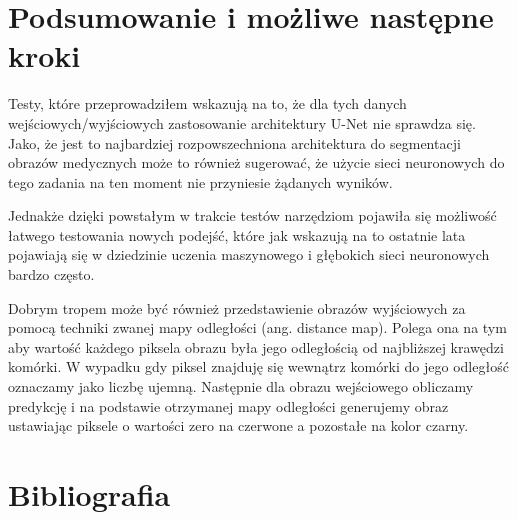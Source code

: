 \documentclass{article}
\begin{document}
\section{Podsumowanie i możliwe następne kroki}
Testy, które przeprowadziłem wskazują na to, że dla tych danych wejściowych/wyjściowych zastosowanie architektury U-Net nie sprawdza się.
Jako, że jest to najbardziej rozpowszechniona architektura do segmentacji obrazów medycznych może to również sugerować, że użycie sieci neuronowych do tego zadania na ten moment nie przyniesie żądanych wyników.

Jednakże dzięki powstałym w trakcie testów narzędziom pojawiła się możliwość łatwego testowania nowych podejść, które jak wskazują na to ostatnie lata pojawiają się w dziedzinie uczenia maszynowego i głębokich sieci neuronowych bardzo często.

Dobrym tropem może być również przedstawienie obrazów wyjściowych za pomocą techniki zwanej mapy odległości (ang. distance map).
Polega ona na tym aby wartość każdego piksela obrazu była
jego odległością od najbliższej krawędzi komórki.
W wypadku gdy piksel znajduję się wewnątrz komórki do jego odległość oznaczamy jako liczbę ujemną. Następnie dla obrazu wejściowego obliczamy predykcję i na podstawie otrzymanej mapy odległości generujemy obraz ustawiając piksele o wartości zero na czerwone a pozostałe na kolor czarny.
\newpage
\section{Bibliografia}
{}

\end{document}

